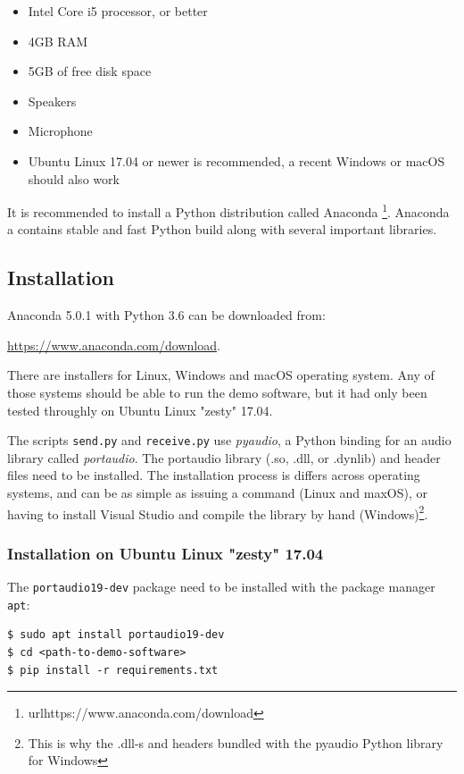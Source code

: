 \documentclass[a4paper]{article}
\begin{document}
\begin{itemize}
\item Intel Core i5 processor, or better
\item 4GB RAM
\item 5GB of free disk space
\item Speakers
\item Microphone
\item Ubuntu Linux 17.04 or newer is recommended, a recent Windows or
macOS should also work
\end{itemize}

It is recommended to install a Python distribution called Anaconda
\footnote{url{https://www.anaconda.com/download}}. Anaconda a contains
stable and fast Python build along with several important libraries.

\subsection{Installation}

Anaconda 5.0.1 with Python 3.6 can be downloaded from:

\url{https://www.anaconda.com/download}.

There are installers for 
Linux, Windows and macOS operating system. Any of those systems should 
be able to run the demo software, but it had only been tested throughly 
on Ubuntu Linux "zesty" 17.04.

The scripts \texttt{send.py} and \texttt{receive.py} use 
\textit{pyaudio}, a Python binding for an audio library called 
\textit{portaudio}. The portaudio library (.so, .dll, or .dynlib) and 
header files need to be installed. The installation process is differs 
across operating systems, and can be as simple as issuing a command 
(Linux and maxOS), or having to install Visual Studio and compile the 
library by hand (Windows)\footnote{This is why the .dll-s and headers 
bundled with the pyaudio Python library for Windows}.

\subsubsection{Installation on Ubuntu Linux "zesty" 17.04}

The \texttt{portaudio19-dev} package need to be installed with the 
package manager \texttt{apt}:

\begin{lstlisting}
$ sudo apt install portaudio19-dev
$ cd <path-to-demo-software>
$ pip install -r requirements.txt
\end{lstlisting}
\end{document}
